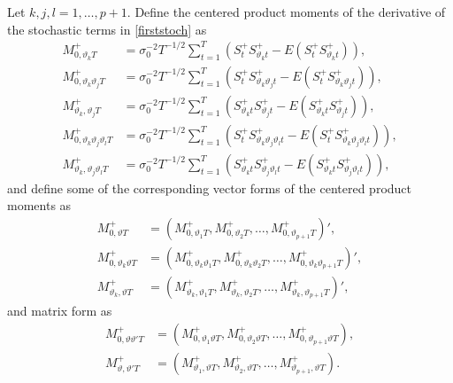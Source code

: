 {{Let $k,j,l = 1,\ldots, p+ 1$. Define the centered product moments of the derivative of the stochastic terms in \eqref{firststoch} as
\begin{align}
    M^+_{0,\vartheta_k  T} &= \sigma^{-2}_0 T^{-1/2} \sum_{t = 1}^T \left( S^+_{t} S^+_{\vartheta_k t} - E\left( S^+_{t} S^+_{\vartheta_k t} \right) \right), \label{genMta} \\
     M^+_{0,\vartheta_k \vartheta_j   T} &= \sigma^{-2}_0 T^{-1/2} \sum_{t = 1}^T \left( S^+_{t} S^+_{\vartheta_k \vartheta_j  t} - E\left( S^+_{t} S^+_{\vartheta_k \vartheta_j  t} \right) \right), \label{genMtb} \\
     M^+_{\vartheta_k,\vartheta_j   T} &= \sigma^{-2}_0 T^{-1/2} \sum_{t = 1}^T \left( S^+_{\vartheta_k t} S^+_{ \vartheta_j  t} - E\left( S^+_{\vartheta_k t} S^+_{\vartheta_j  t} \right) \right), \label{genMtc} \\
     M^+_{0,\vartheta_k \vartheta_j \vartheta_l  T} &= \sigma^{-2}_0 T^{-1/2} \sum_{t = 1}^T \left( S^+_{t} S^+_{ \vartheta_k \vartheta_j \vartheta_l  t} - E\left( S^+_{t} S^+_{\vartheta_k \vartheta_j \vartheta_l  t} \right) \right), \label{genMtd} \\
     M^+_{\vartheta_k,\vartheta_j \vartheta_l  T} &= \sigma^{-2}_0 T^{-1/2} \sum_{t = 1}^T \left( S^+_{\vartheta_k t} S^+_{ \vartheta_j \vartheta_l  t} - E\left( S^+_{\vartheta_k t} S^+_{\vartheta_j \vartheta_l  t} \right) \right), \label{genMte}
\end{align}
and define some of the corresponding vector forms of the centered product moments as 
\begin{align}
     M^+_{0,\vartheta T} &= (M^+_{0,\vartheta_1  T}, M^+_{0,\vartheta_2  T},\ldots, M^+_{0,\vartheta_{p+1}  T})' ,\label{genM1}\\
     M^+_{0,\vartheta_k \vartheta T} &= ( M^+_{0,\vartheta_k \vartheta_1 T} ,  M^+_{0,\vartheta_k \vartheta_2 T} ,\ldots,  M^+_{0,\vartheta_k \vartheta_{p+1} T} )' ,\label{genvM2}\\
      M^+_{\vartheta_k,\vartheta T} &= ( M^+_{\vartheta_k,\vartheta_1 T} ,   M^+_{\vartheta_k,\vartheta_2 T} ,\ldots,   M^+_{\vartheta_k,\vartheta_{p+1} T} )', \label{genvM3}
\end{align}
and matrix form as 
\begin{align}
 M^+_{0,\vartheta \vartheta' T} &=  ( M^+_{0,\vartheta_1 \vartheta T}, M^+_{0,\vartheta_2 \vartheta T}, \ldots,  M^+_{0,\vartheta_{p+1} \vartheta T}  ) ,\label{genM2}\\
       M^+_{\vartheta,\vartheta' T} &= (  M^+_{\vartheta_1,\vartheta T},  M^+_{\vartheta_2,\vartheta T}, \ldots,  M^+_{\vartheta_{p+1},\vartheta T}  ) .\label{genM3}
\end{align}


}}
